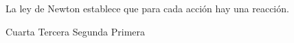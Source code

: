 
\question La \fillin \enspace ley de Newton establece que para cada acción
          hay una reacción.

  \begin{oneparchoices}
    \choice Cuarta
    \CorrectChoice Tercera
    \choice Segunda
    \choice Primera
  \end{oneparchoices}
  \answerline[B]
